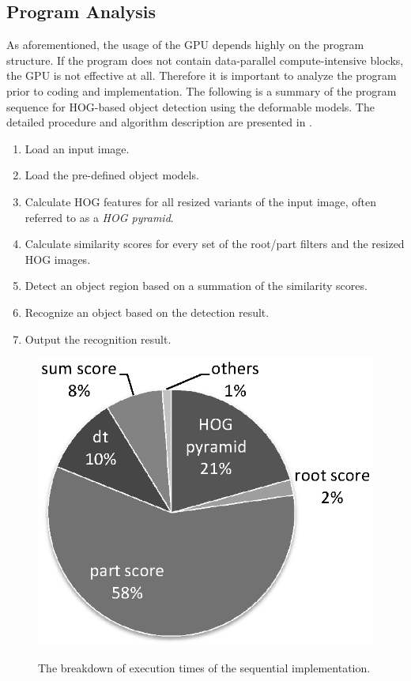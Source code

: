 \subsection{Program Analysis}
\label{sec:analysis}

As aforementioned, the usage of the GPU depends highly on the program
structure.
If the program does not contain data-parallel compute-intensive blocks,
the GPU is not effective at all.
Therefore it is important to analyze the program prior to coding and
implementation.
The following is a summary of the program sequence for HOG-based object
detection using the deformable models.
The detailed procedure and algorithm description are presented in
\cite{Felzenszwalb10, Niknejad12}.

\begin{enumerate}
\item Load an input image.
\item Load the pre-defined object models.
\item Calculate HOG features for all resized variants of the input
      image, often referred to as a \textit{HOG pyramid}.
\item Calculate similarity scores for every set of the root/part filters
      and the resized HOG images.
\item Detect an object region based on a summation of the similarity
      scores.
\item Recognize an object based on the detection result.
\item Output the recognition result.
\end{enumerate}

\begin{figure}[t]
 \begin{center}
  \includegraphics[width=0.5\hsize]{fig/breakdown.eps}\\
  \caption{The breakdown of execution times of the sequential
  implementation.}
  \label{fig:breakdown}
 \end{center}
\end{figure}

